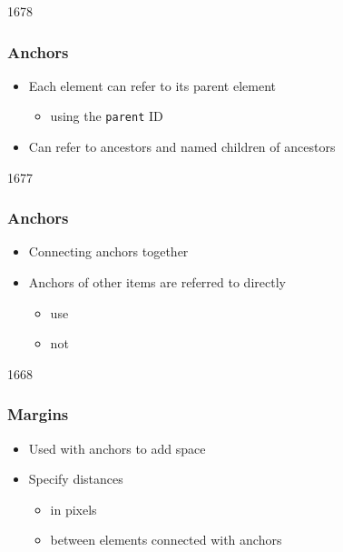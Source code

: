 
\begin{slide}{1678}\frametitle{Anchors}


\begin{itemize}
\item Each element can refer to its parent element
  \begin{itemize}
  \item using the \texttt{parent} ID
  \end{itemize}
\item Can refer to ancestors and named children of ancestors
\end{itemize}                               


\end{slide}


\begin{slide}{1677}\frametitle{Anchors}


\begin{itemize}
\item Connecting anchors together
\item Anchors of other items are referred to directly
  \begin{itemize}
  \item use 
  \item not 
  \end{itemize}
\end{itemize}
\end{slide}


\begin{slide}{1668}\frametitle{Margins}

\begin{itemize}
\item Used with anchors to add space
\item Specify distances
  \begin{itemize}
  \item in pixels
  \item between elements connected with anchors
  \end{itemize}
\end{itemize}


\end{slide}

